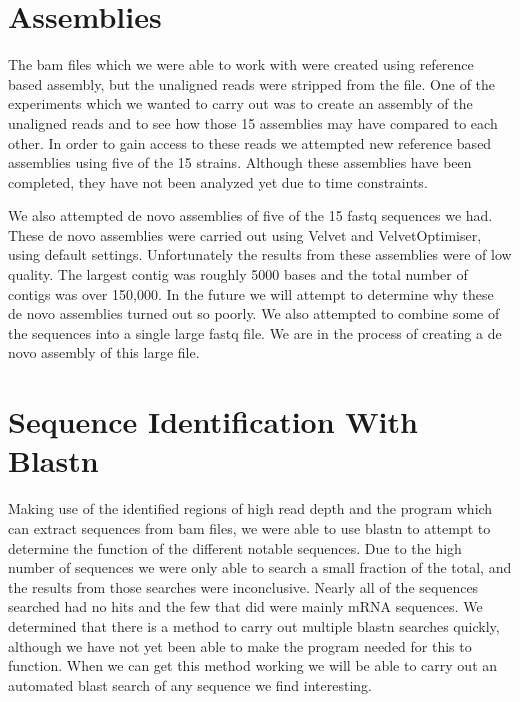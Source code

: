\documentclass[12pt]{article}
\begin{document}
%
%
\vspace{-0.5cm}
\section{Assemblies}
\vspace{-0.5cm}
	The bam files which we were able to work with were created using reference based assembly, but the unaligned reads were stripped from the file. One of the experiments which we wanted to carry out was to create an assembly of the unaligned reads and to see how those 15 assemblies may have compared to each other. In order to gain access to these reads we attempted new reference based assemblies using five of the 15 strains. Although these assemblies have been completed, they have not been analyzed yet due to time constraints.

	We also attempted de novo assemblies of five of the 15 fastq sequences we had. These de novo assemblies were carried out using Velvet and VelvetOptimiser, using default settings. Unfortunately the results from these assemblies were of low quality. The largest contig was roughly 5000 bases and the total number of contigs was over 150,000. In the future we will attempt to determine why these de novo assemblies turned out so poorly. We also attempted to combine some of the sequences into a single large fastq file. We are in the process of creating a de novo assembly of this large file.

%
%
\vspace{-0.5cm}
\section{Sequence Identification With Blastn}
\vspace{-0.5cm}
	Making use of the identified regions of high read depth and the program which can extract sequences from bam files, we were able to use blastn to attempt to determine the function of the different notable sequences. Due to the high number of sequences we were only able to search a small fraction of the total, and the results from those searches were inconclusive. Nearly all of the sequences searched had no hits and the few that did were mainly mRNA sequences. We determined that there is a method to carry out multiple blastn searches quickly, although we have not yet been able to make the program needed for this to function. When we can get this method working we will be able to carry out an automated blast search of any sequence we find interesting.   
\end{document}
